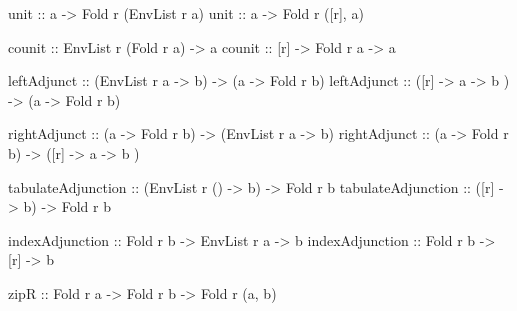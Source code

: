 \documentclass[]{article}
\newenvironment{Shaded}{}{}
\newcommand{\DataTypeTok}[1]{\textcolor[rgb]{0.56,0.13,0.00}{#1}}
\newcommand{\NormalTok}[1]{#1}
\newcommand{\OtherTok}[1]{\textcolor[rgb]{0.00,0.44,0.13}{#1}}
\begin{document}
\begin{Shaded}
\begin{Highlighting}[]
\OtherTok{unit ::}\NormalTok{ a }\OtherTok{{-}\textgreater{}} \DataTypeTok{Fold}\NormalTok{ r (}\DataTypeTok{EnvList}\NormalTok{ r a)}
\OtherTok{unit ::}\NormalTok{ a }\OtherTok{{-}\textgreater{}} \DataTypeTok{Fold}\NormalTok{ r ([r], a)}

\OtherTok{counit ::} \DataTypeTok{EnvList}\NormalTok{ r (}\DataTypeTok{Fold}\NormalTok{ r a) }\OtherTok{{-}\textgreater{}}\NormalTok{ a}
\OtherTok{counit ::}\NormalTok{ [r] }\OtherTok{{-}\textgreater{}} \DataTypeTok{Fold}\NormalTok{ r a }\OtherTok{{-}\textgreater{}}\NormalTok{ a}

\OtherTok{leftAdjunct ::}\NormalTok{ (}\DataTypeTok{EnvList}\NormalTok{ r a }\OtherTok{{-}\textgreater{}}\NormalTok{ b) }\OtherTok{{-}\textgreater{}}\NormalTok{ (a }\OtherTok{{-}\textgreater{}} \DataTypeTok{Fold}\NormalTok{ r b)}
\OtherTok{leftAdjunct ::}\NormalTok{ ([r] }\OtherTok{{-}\textgreater{}}\NormalTok{ a }\OtherTok{{-}\textgreater{}}\NormalTok{ b   ) }\OtherTok{{-}\textgreater{}}\NormalTok{ (a }\OtherTok{{-}\textgreater{}} \DataTypeTok{Fold}\NormalTok{ r b)}

\OtherTok{rightAdjunct ::}\NormalTok{ (a }\OtherTok{{-}\textgreater{}} \DataTypeTok{Fold}\NormalTok{ r b) }\OtherTok{{-}\textgreater{}}\NormalTok{ (}\DataTypeTok{EnvList}\NormalTok{ r a }\OtherTok{{-}\textgreater{}}\NormalTok{ b)}
\OtherTok{rightAdjunct ::}\NormalTok{ (a }\OtherTok{{-}\textgreater{}} \DataTypeTok{Fold}\NormalTok{ r b) }\OtherTok{{-}\textgreater{}}\NormalTok{ ([r] }\OtherTok{{-}\textgreater{}}\NormalTok{ a }\OtherTok{{-}\textgreater{}}\NormalTok{ b   )}

\OtherTok{tabulateAdjunction ::}\NormalTok{ (}\DataTypeTok{EnvList}\NormalTok{ r () }\OtherTok{{-}\textgreater{}}\NormalTok{ b) }\OtherTok{{-}\textgreater{}} \DataTypeTok{Fold}\NormalTok{ r b}
\OtherTok{tabulateAdjunction ::}\NormalTok{ ([r] }\OtherTok{{-}\textgreater{}}\NormalTok{ b)          }\OtherTok{{-}\textgreater{}} \DataTypeTok{Fold}\NormalTok{ r b}

\OtherTok{indexAdjunction ::} \DataTypeTok{Fold}\NormalTok{ r b }\OtherTok{{-}\textgreater{}} \DataTypeTok{EnvList}\NormalTok{ r a }\OtherTok{{-}\textgreater{}}\NormalTok{ b}
\OtherTok{indexAdjunction ::} \DataTypeTok{Fold}\NormalTok{ r b }\OtherTok{{-}\textgreater{}}\NormalTok{ [r]         }\OtherTok{{-}\textgreater{}}\NormalTok{ b}

\OtherTok{zipR ::} \DataTypeTok{Fold}\NormalTok{ r a }\OtherTok{{-}\textgreater{}} \DataTypeTok{Fold}\NormalTok{ r b }\OtherTok{{-}\textgreater{}} \DataTypeTok{Fold}\NormalTok{ r (a, b)}
\end{Highlighting}
\end{Shaded}
\end{document}
